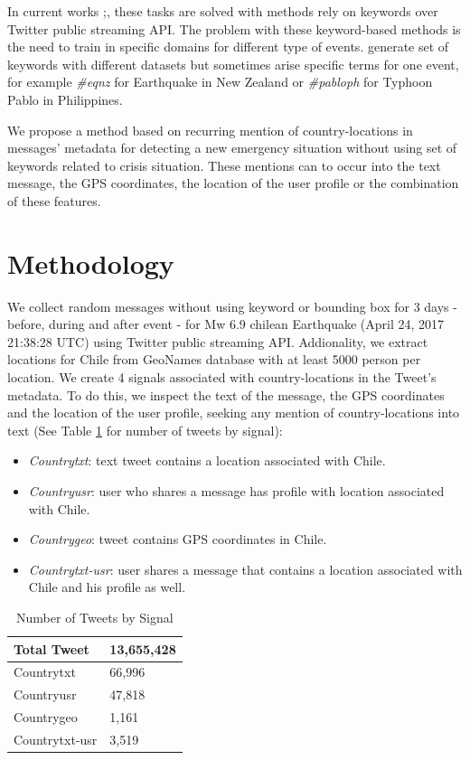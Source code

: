 \documentclass[letterpaper]{article} %
\begin{document}
In current works \cite{ashktorab2014tweedr};\cite{imranaidr2014}, these tasks are solved with methods rely on keywords over Twitter public streaming API. The problem with these keyword-based methods is the need to train in specific domains for different type of events.\cite{olteanu2014} generate set of keywords with different datasets but sometimes arise specific terms for one event, for example \textit{\#eqnz} for Earthquake in New Zealand or \textit{\#pabloph} for Typhoon Pablo in Philippines.

We propose a method based on recurring mention of country-locations in messages' metadata for detecting a new emergency situation without using set of keywords related to crisis situation. These mentions can to occur into the text message, the GPS coordinates, the location of the user profile or the combination of these features.


\section{Methodology}

We collect random messages without using keyword or bounding box for 3 days - before, during and after event - for Mw 6.9 chilean Earthquake (April 24, 2017 21:38:28 UTC) using Twitter public streaming API. Addionality, we extract locations for Chile from GeoNames database with at least 5000 person per location. We create 4 signals associated with country-locations in the Tweet's metadata. To do this, we inspect the text of the message, the GPS coordinates and the location of the user profile, seeking any mention of country-locations into text (See Table \ref{signalsTweets} for number of tweets by signal):

\begin{itemize}
	\item \textit{Countrytxt}: text tweet contains a location associated with Chile.
	\item \textit{Countryusr}: user who shares a message has profile with location associated with Chile.
	\item \textit{Countrygeo}: tweet contains GPS coordinates in Chile.
	\item \textit{Countrytxt-usr}: user shares a message that contains a location associated with Chile and his profile as well.
\end{itemize}

\begin{table}[]
	\centering
	\begin{tabular}{|l|l|}
		\hline
		Total Tweet    & 13,655,428 \\ \hline
		Countrytxt     & 66,996     \\ \hline
		Countryusr     & 47,818     \\ \hline
		Countrygeo     & 1,161      \\ \hline
		Countrytxt-usr & 3,519      \\ \hline
	\end{tabular}
	\caption{Number of Tweets by Signal}
	\label{signalsTweets}
\end{table}
\end{document}
